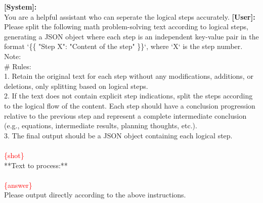 \begin{tcolorbox}[title=LLM discrimination prompt $p_s$, label={fig:verify_prompt_v01_rr}, breakable]
\textbf{[System]:}\\
You are a helpful assistant who can seperate the logical steps accurately.
\tcblower
\textbf{[User]:}\\

Please split the following math problem-solving text according to logical 
steps, generating a JSON object where each step is an independent key-value 
pair in the format `\{\{ "Step X": "Content of the step" \}\}`, where `X` is the step number. Note:\\

\# Rules:\\
1. Retain the original text for each step without any modifications, additions, or deletions, only splitting based on logical steps.\\
2. If the text does not contain explicit step indications, split the steps according to the logical flow of the content. Each step should have a conclusion progression relative to the previous step and represent a complete intermediate conclusion (e.g., equations, intermediate results, planning thoughts, etc.).\\
3. The final output should be a JSON object containing each logical step.\\
\\
\textcolor{red}{\{shot\}}
\\
**Text to process:**\\
\\
\textcolor{red}{\{answer\}}
\\
Please output directly according to the above instructions.\\

\end{tcolorbox}